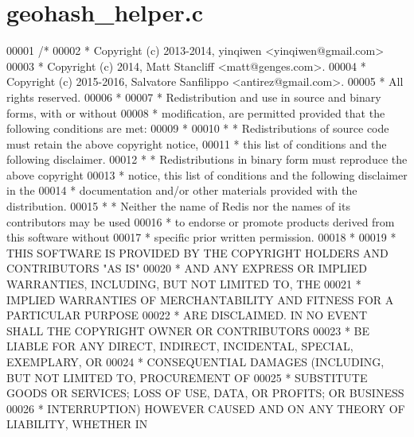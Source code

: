\hypertarget{geohash__helper_8c_source}{}\section{geohash\+\_\+helper.\+c}
\label{geohash__helper_8c_source}

\begin{DoxyCode}
00001 \textcolor{comment}{/*}
00002 \textcolor{comment}{ * Copyright (c) 2013-2014, yinqiwen <yinqiwen@gmail.com>}
00003 \textcolor{comment}{ * Copyright (c) 2014, Matt Stancliff <matt@genges.com>.}
00004 \textcolor{comment}{ * Copyright (c) 2015-2016, Salvatore Sanfilippo <antirez@gmail.com>.}
00005 \textcolor{comment}{ * All rights reserved.}
00006 \textcolor{comment}{ *}
00007 \textcolor{comment}{ * Redistribution and use in source and binary forms, with or without}
00008 \textcolor{comment}{ * modification, are permitted provided that the following conditions are met:}
00009 \textcolor{comment}{ *}
00010 \textcolor{comment}{ *  * Redistributions of source code must retain the above copyright notice,}
00011 \textcolor{comment}{ *    this list of conditions and the following disclaimer.}
00012 \textcolor{comment}{ *  * Redistributions in binary form must reproduce the above copyright}
00013 \textcolor{comment}{ *    notice, this list of conditions and the following disclaimer in the}
00014 \textcolor{comment}{ *    documentation and/or other materials provided with the distribution.}
00015 \textcolor{comment}{ *  * Neither the name of Redis nor the names of its contributors may be used}
00016 \textcolor{comment}{ *    to endorse or promote products derived from this software without}
00017 \textcolor{comment}{ *    specific prior written permission.}
00018 \textcolor{comment}{ *}
00019 \textcolor{comment}{ * THIS SOFTWARE IS PROVIDED BY THE COPYRIGHT HOLDERS AND CONTRIBUTORS "AS IS"}
00020 \textcolor{comment}{ * AND ANY EXPRESS OR IMPLIED WARRANTIES, INCLUDING, BUT NOT LIMITED TO, THE}
00021 \textcolor{comment}{ * IMPLIED WARRANTIES OF MERCHANTABILITY AND FITNESS FOR A PARTICULAR PURPOSE}
00022 \textcolor{comment}{ * ARE DISCLAIMED. IN NO EVENT SHALL THE COPYRIGHT OWNER OR CONTRIBUTORS}
00023 \textcolor{comment}{ * BE LIABLE FOR ANY DIRECT, INDIRECT, INCIDENTAL, SPECIAL, EXEMPLARY, OR}
00024 \textcolor{comment}{ * CONSEQUENTIAL DAMAGES (INCLUDING, BUT NOT LIMITED TO, PROCUREMENT OF}
00025 \textcolor{comment}{ * SUBSTITUTE GOODS OR SERVICES; LOSS OF USE, DATA, OR PROFITS; OR BUSINESS}
00026 \textcolor{comment}{ * INTERRUPTION) HOWEVER CAUSED AND ON ANY THEORY OF LIABILITY, WHETHER IN}

\end{DoxyCode}
